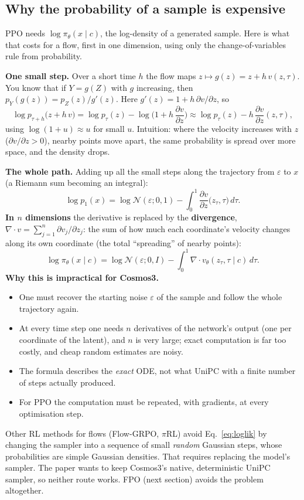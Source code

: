 \documentclass[11pt,a4paper]{article}
\newcommand{\N}{\mathcal{N}}
\begin{document}
\subsection{Why the probability of a sample is expensive}\label{sec:loglik}
PPO needs $\log\pi_\theta(x\mid c)$, the log-density of a generated sample. Here is what that costs for a flow, first in one dimension, using only the change-of-variables rule from probability.

\textbf{One small step.} Over a short time $h$ the flow maps $z\mapsto g(z)=z+h\,v(z,\tau)$. You know that if $Y=g(Z)$ with $g$ increasing, then $p_Y(g(z))=p_Z(z)/g'(z)$. Here $g'(z)=1+h\,\partial v/\partial z$, so
\[
\log p_{\tau+h}\big(z+h\,v\big)=\log p_\tau(z)-\log\Big(1+h\,\frac{\partial v}{\partial z}\Big)\approx\log p_\tau(z)-h\,\frac{\partial v}{\partial z}(z,\tau),
\]
using $\log(1+u)\approx u$ for small $u$. Intuition: where the velocity increases with $z$ ($\partial v/\partial z>0$), nearby points move apart, the same probability is spread over more space, and the density drops.

\textbf{The whole path.} Adding up all the small steps along the trajectory from $\varepsilon$ to $x$ (a Riemann sum becoming an integral):
\begin{equation}
\log p_1(x)=\log\N(\varepsilon;0,1)-\int_0^1\frac{\partial v}{\partial z}\big(z_\tau,\tau\big)\,d\tau .
\end{equation}
\textbf{In $n$ dimensions} the derivative is replaced by the \textbf{divergence}, $\nabla\!\cdot v=\sum_{j=1}^n\partial v_j/\partial z_j$: the sum of how much each coordinate's velocity changes along its own coordinate (the total ``spreading'' of nearby points):
\begin{equation}
\log\pi_\theta(x\mid c)=\log\N(\varepsilon;0,I)-\int_0^1\nabla\!\cdot v_\theta(z_\tau,\tau\mid c)\,d\tau .
\label{eq:loglik}
\end{equation}
\textbf{Why this is impractical for Cosmos3.}
\begin{itemize}
\item One must recover the starting noise $\varepsilon$ of the sample and follow the whole trajectory again.
\item At every time step one needs $n$ derivatives of the network's output (one per coordinate of the latent), and $n$ is very large; exact computation is far too costly, and cheap random estimates are noisy.
\item The formula describes the \emph{exact} ODE, not what UniPC with a finite number of steps actually produced.
\item For PPO the computation must be repeated, with gradients, at every optimisation step.
\end{itemize}
Other RL methods for flows (Flow-GRPO, $\pi$RL) avoid Eq.~\eqref{eq:loglik} by changing the sampler into a sequence of small \emph{random} Gaussian steps, whose probabilities are simple Gaussian densities. That requires replacing the model's sampler. The paper wants to keep Cosmos3's native, deterministic UniPC sampler, so neither route works. FPO (next section) avoids the problem altogether.
\end{document}
